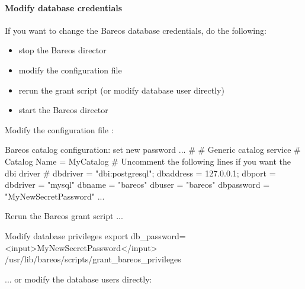 \paragraph{Modify database credentials}

If you want to change the Bareos database credentials, do the following:

\begin{itemize}
    \item stop the Bareos director
    \item modify the configuration file \configFileDirUnix
    \item rerun the grant script  (or modify database user directly)
    \item start the Bareos director
\end{itemize}

Modify the configuration file \configFileDirUnix:

\begin{bconfig}{Bareos catalog configuration: set new password}
...
#
# Generic catalog service
#
Catalog {
  Name = MyCatalog
  # Uncomment the following lines if you want the dbi driver
  # dbdriver = "dbi:postgresql"; dbaddress = 127.0.0.1; dbport =  
  dbdriver = "mysql"
  dbname = "bareos"
  dbuser = "bareos"
  dbpassword = "MyNewSecretPassword"
}
...
\end{bconfig}

Rerun the Bareos grant script  ...

\begin{commands}{Modify database privileges}
export db_password=<input>MyNewSecretPassword</input>
/usr/lib/bareos/scripts/grant_bareos_privileges
\end{commands}

... or modify the database users directly:

